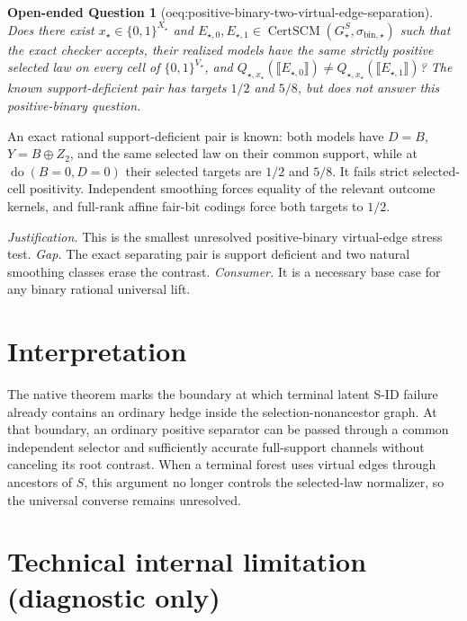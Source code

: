 \documentclass{article}
\newtheorem{openendedquestion}{Open-ended Question}
\begin{document}
\begin{openendedquestion}[oeq:positive-binary-two-virtual-edge-separation]\label{oeq:positive-binary-two-virtual-edge-separation}
Does there exist \(x_\star\in\{0,1\}^{X_\star}\) and \(E_{\star,0},E_{\star,1}\in\operatorname{CertSCM}(G_\star^S,\sigma_{\mathrm{bin},\star})\) such that the exact checker accepts, their realized models have the same strictly positive selected law on every cell of \(\{0,1\}^{V_\star}\), and \(Q_{\star,x_\star}(\llbracket E_{\star,0}\rrbracket)\ne Q_{\star,x_\star}(\llbracket E_{\star,1}\rrbracket)\)? The known support-deficient pair has targets \(1/2\) and \(5/8\), but does not answer this positive-binary question.
\end{openendedquestion}
An exact rational support-deficient pair is known: both models have \(D=B\), \(Y=B\oplus Z_2\), and the same selected law on their common support, while at \(\operatorname{do}(B=0,D=0)\) their selected targets are \(1/2\) and \(5/8\). It fails strict selected-cell positivity. Independent smoothing forces equality of the relevant outcome kernels, and full-rank affine fair-bit codings force both targets to \(1/2\).
\par\smallskip\noindent \textit{Justification.} This is the smallest unresolved positive-binary virtual-edge stress test. \textit{Gap.} The exact separating pair is support deficient and two natural smoothing classes erase the contrast. \textit{Consumer.} It is a necessary base case for any binary rational universal lift.

\section{Interpretation}

The native theorem marks the boundary at which terminal latent S-ID failure already contains an ordinary hedge inside the selection-nonancestor graph. At that boundary, an ordinary positive separator can be passed through a common independent selector and sufficiently accurate full-support channels without canceling its root contrast. When a terminal forest uses virtual edges through ancestors of \(S\), this argument no longer controls the selected-law normalizer, so the universal converse remains unresolved.

\section*{Technical internal limitation (diagnostic only)}
\end{document}
